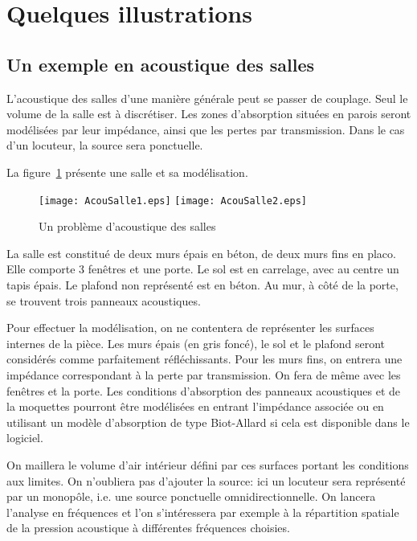 {\medskip
\section{Quelques illustrations}\label{Sec-AcouIllus}

\medskip
\subsection{Un exemple en acoustique des salles}

L'acoustique des salles d'une manière générale peut se passer de couplage. Seul le volume de la salle est à discrétiser. Les zones d'absorption situées en parois seront modélisées par leur impédance, ainsi que les pertes par transmission. Dans le cas d'un locuteur, la source sera ponctuelle.

La figure~\ref{Fig-AcouSalle} présente une salle et sa modélisation.
\begin{figure}[h!]
\centering
\texttt{[image: AcouSalle1.eps]}\hspace{10mm}
\texttt{[image: AcouSalle2.eps]}
\caption{Un problème d'acoustique des salles}\label{Fig-AcouSalle}
\end{figure}
La salle est constitué de deux murs épais en béton, de deux murs fins en placo. Elle comporte 3 fenêtres et une porte. Le sol est en carrelage, avec au centre un tapis épais. Le plafond non représenté est en béton. Au mur, à côté de la porte, se trouvent trois panneaux acoustiques.

Pour effectuer la modélisation, on ne contentera de représenter les surfaces internes de la pièce. Les murs épais (en gris foncé), le sol et le plafond seront considérés comme parfaitement réfléchissants. Pour les murs fins, on entrera une impédance correspondant à la perte par transmission. On fera de même avec les fenêtres et la porte. Les conditions d'absorption des panneaux acoustiques et de la moquettes pourront être modélisées en entrant l'impédance associée ou en utilisant un modèle d'absorption de type Biot-Allard si cela est disponible dans le logiciel.

On maillera le volume d'air intérieur défini par ces surfaces portant les conditions aux limites. On n'oubliera pas d'ajouter la source: ici un locuteur sera représenté par un monopôle, i.e. une source ponctuelle omnidirectionnelle. On lancera l'analyse en fréquences et l'on s'intéressera par exemple à la répartition spatiale de la pression acoustique à différentes fréquences choisies.


}
